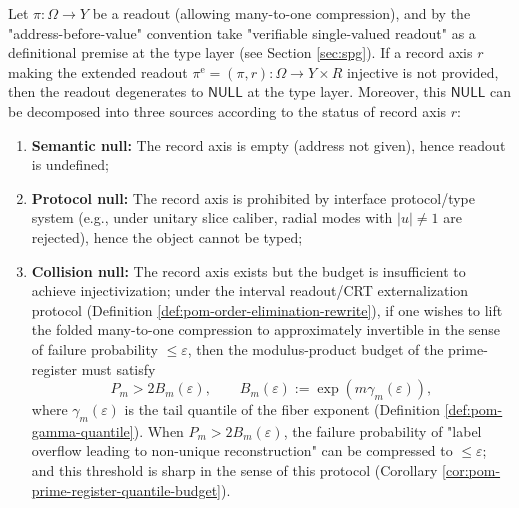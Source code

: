 \begin{proposition}\label{prop:xi-null-three-way}
Let \(\pi:\Omega\to Y\) be a readout (allowing many-to-one compression), and by the "address-before-value" convention take "verifiable single-valued readout" as a definitional premise at the type layer (see Section \ref{sec:spg}).
If a record axis \(r\) making the extended readout \(\pi^{\mathrm e}=(\pi,r):\Omega\to Y\times R\) injective is not provided, then the readout degenerates to \(\mathsf{NULL}\) at the type layer.
Moreover, this \(\mathsf{NULL}\) can be decomposed into three sources according to the status of record axis \(r\):
\begin{enumerate}
  \item \textbf{Semantic null:} The record axis is empty (address not given), hence readout is undefined;
  \item \textbf{Protocol null:} The record axis is prohibited by interface protocol/type system (e.g., under unitary slice caliber, radial modes with \(|u|\neq 1\) are rejected), hence the object cannot be typed;
  \item \textbf{Collision null:} The record axis exists but the budget is insufficient to achieve injectivization; under the interval readout/CRT externalization protocol (Definition \ref{def:pom-order-elimination-rewrite}), if one wishes to lift the folded many-to-one compression to approximately invertible in the sense of failure probability \(\le\varepsilon\), then the modulus-product budget of the prime-register must satisfy
  \[
  P_m>2B_m(\varepsilon),
  \qquad
  B_m(\varepsilon):=\exp(m\gamma_m(\varepsilon)),
  \]
  where \(\gamma_m(\varepsilon)\) is the tail quantile of the fiber exponent (Definition \ref{def:pom-gamma-quantile}).
  When \(P_m>2B_m(\varepsilon)\), the failure probability of "label overflow leading to non-unique reconstruction" can be compressed to \(\le\varepsilon\); and this threshold is sharp in the sense of this protocol (Corollary \ref{cor:pom-prime-register-quantile-budget}).
\end{enumerate}
\end{proposition}

